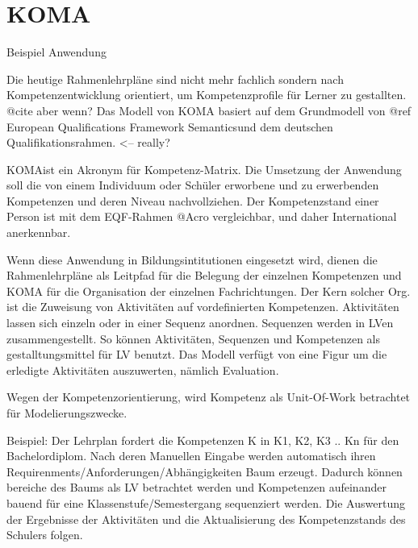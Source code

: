 \documentclass[
12pt,
english,
ngerman,
headsepline,
twoside,
openright,
numbers=noenddot,version=first
]{scrreprt}
\begin{document}



\section{KOMA}{Beispiel Anwendung}
\label{sec:KOMA}

Die heutige Rahmenlehrpläne sind nicht mehr fachlich sondern nach Kompetenzentwicklung orientiert, um Kompetenzprofile für Lerner zu gestallten. @cite aber wenn?
Das Modell von KOMA basiert auf dem Grundmodell von
@ref \glqq European Qualifications Framework Semantics\grqq und dem deutschen Qualifikationsrahmen. <-- really?

\glqq KOMA\grqq ist ein Akronym für Kompetenz-Matrix. Die Umsetzung der Anwendung soll die von einem Individuum oder Schüler
erworbene und zu erwerbenden Kompetenzen und deren Niveau nachvollziehen.
Der Kompetenzstand einer Person ist mit dem EQF-Rahmen @Acro vergleichbar, und daher International anerkennbar.

Wenn diese Anwendung in Bildungsintitutionen eingesetzt wird, dienen die Rahmenlehrpläne als Leitpfad für die Belegung der einzelnen Kompetenzen
und KOMA für die Organisation der einzelnen Fachrichtungen. Der Kern solcher Org. ist die Zuweisung von Aktivitäten auf vordefinierten Kompetenzen.
Aktivitäten lassen sich einzeln oder in einer Sequenz anordnen. Sequenzen werden in LVen zusammengestellt. So können Aktivitäten, Sequenzen und Kompetenzen
als gestalltungsmittel für LV benutzt. Das Modell verfügt von eine Figur um die erledigte Aktivitäten auszuwerten, nämlich Evaluation.

Wegen der Kompetenzorientierung, wird Kompetenz als Unit-Of-Work betrachtet für Modelierungszwecke.

Beispiel:
Der Lehrplan fordert die Kompetenzen K in K1, K2, K3 .. Kn für den Bachelordiplom. Nach deren Manuellen Eingabe werden automatisch
ihren Requirenments/Anforderungen/Abhängigkeiten Baum erzeugt. Dadurch können bereiche des Baums als LV betrachtet werden und Kompetenzen aufeinander
bauend für eine Klassenstufe/Semestergang sequenziert werden. Die Auswertung der Ergebnisse der Aktivitäten und die Aktualisierung des Kompetenzstands
des Schulers folgen.
\end{document}
